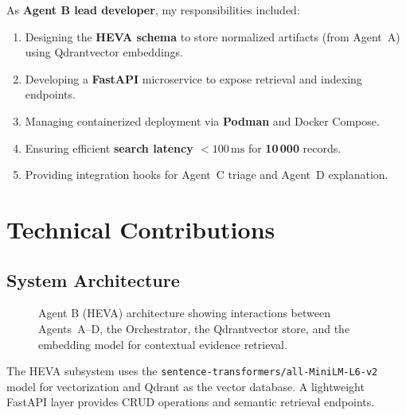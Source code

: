 \documentclass[12pt,a4paper]{article}
\begin{document}
As \textbf{Agent B lead developer}, my responsibilities included:
\begin{enumerate}[noitemsep]
    \item Designing the \textbf{HEVA schema} to store normalized artifacts (from Agent~A) using Qdrantvector embeddings.
    \item Developing a \textbf{FastAPI} microservice to expose retrieval and indexing endpoints.
    \item Managing containerized deployment via \textbf{Podman} and Docker Compose.
    \item Ensuring efficient \textbf{search latency $< 100\,\mathrm{ms}$} for \textbf{10\,000} records.
    \item Providing integration hooks for Agent~C triage and Agent~D explanation.
\end{enumerate}

\section{Technical Contributions}
\label{sec:tech}
\subsection{System Architecture}
\begin{figure}[H]
\centering
{}
\caption{Agent B (HEVA) architecture showing interactions between Agents~A--D, the Orchestrator, the Qdrantvector store, and the embedding model for contextual evidence retrieval.}
\end{figure}

The HEVA subsystem uses the \texttt{sentence-transformers/all-MiniLM-L6-v2} model for vectorization and Qdrant as the vector database. 
A lightweight FastAPI layer provides CRUD operations and semantic retrieval endpoints.
\end{document}
